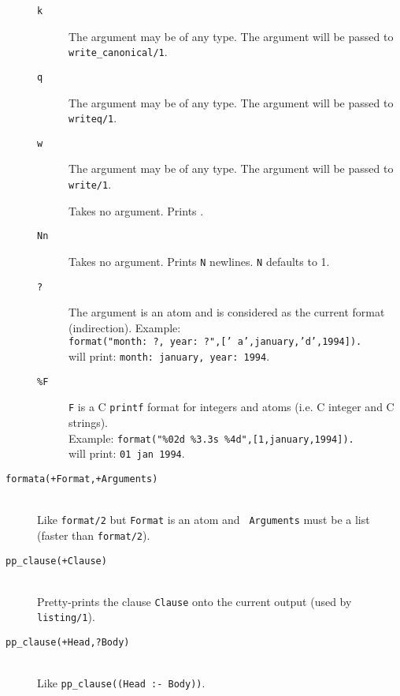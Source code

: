 \begin{description}
\begin{description}
	\item [{\tt \Tild k}]
	The argument may be of any type.  The argument will
	be passed to {\tt write\_canonical/1}.
	
	\item [{\tt \Tild q}]
	The argument may be of any type.  The argument will be
	passed to {\tt writeq/1}.
	
	\item [{\tt \Tild w}]
	The argument may be of any type.  The argument will be passed
	to {\tt write/1}.
	
	\item [{\tt \Tild \Tild}]
	Takes no argument.  Prints {\tt \Tild }.
	
	\item [{\tt \Tild Nn}]
	Takes no argument.  Prints {\tt N} newlines.  {\tt N}
	defaults to 1.

	\item [{\tt \Tild ?}]
	The argument is an atom and is considered as the current format 
	(indirection). Example: \\
	{\tt format("month:~\Tild ?,~year:~\Tild?",['\Tild
      	a',january,'\Tild d',1994]).} \\  
	will print: {\tt month:~january, year:~1994}.

	\item [{\tt \%F}]
	{\tt F} is a C {\tt printf} format for integers and atoms (i.e.
	C integer and C strings). \\
	Example: {\tt format("\%02d~\%3.3s~\%4d",[1,january,1994]).} \\
	will print: {\tt 01~jan~1994}.

	\end{description}

\item [{\tt formata(+Format,+Arguments)}]~\\ 
	Like {\tt format/2} but {\tt Format} is an atom and {\tt
	Arguments} must be a list (faster than {\tt format/2}).


\item [{\tt pp\_clause(+Clause)}]~\\
	Pretty-prints the clause {\tt Clause} onto the current output
	(used by {\tt listing/1}).

\item [{\tt pp\_clause(+Head,?Body)}]~\\
	Like {\tt pp\_clause((Head~:-~Body))}.

\end{description}



